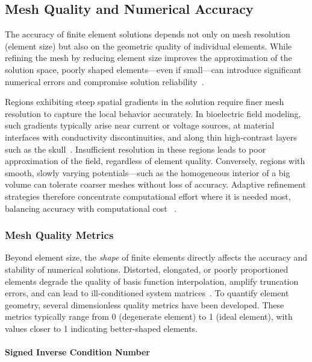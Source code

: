 \subsection{Mesh Quality and Numerical Accuracy}

The accuracy of finite element solutions depends not only on mesh resolution (element size) but also on the geometric quality of individual elements. While refining the mesh by reducing element size improves the approximation of the solution space, poorly shaped elements—even if small—can introduce significant numerical errors and compromise solution reliability~\cite{zienkiewicz-2013}.

Regions exhibiting steep spatial gradients in the solution require finer mesh resolution to capture the local behavior accurately. In bioelectric field modeling, such gradients typically arise near current or voltage sources, at material interfaces with conductivity discontinuities, and along thin high-contrast layers such as the skull~\cite{erdbrugger-2023}. Insufficient resolution in these regions leads to poor approximation of the field, regardless of element quality. Conversely, regions with smooth, slowly varying potentials—such as the homogeneous interior of a big volume can tolerate coarser meshes without loss of accuracy. Adaptive refinement strategies therefore concentrate computational effort where it is needed most, balancing accuracy with computational cost~\cite{zienkiewicz-2013} .


\subsubsection{Mesh Quality Metrics}

Beyond element size, the \textit{shape} of finite elements directly affects the accuracy and stability of numerical solutions. Distorted, elongated, or poorly proportioned elements degrade the quality of basis function interpolation, amplify truncation errors, and can lead to ill-conditioned system matrices~\cite{shewchuk-2002}. To quantify element geometry, several dimensionless quality metrics have been developed. These metrics typically range from 0 (degenerate element) to 1 (ideal element), with values closer to 1 indicating better-shaped elements.

\paragraph*{Signed Inverse Condition Number}

